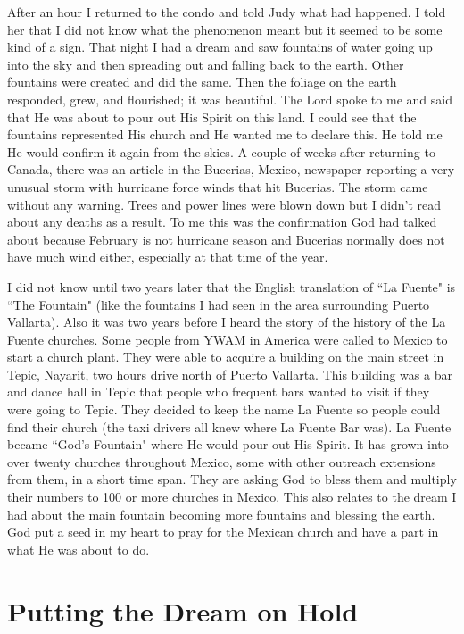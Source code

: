 \documentclass[oneside,12pt]{book}
\begin{document}
After an hour I returned to the condo and told Judy what had happened. I told her that I did not know what the phenomenon meant but it seemed to be some kind of a sign. That night I had a dream and saw fountains of water going up into the sky and then spreading out and falling back to the earth. Other fountains were created and did the same. Then the foliage on the earth responded, grew, and flourished; it was beautiful. The Lord spoke to me and said that He was about to pour out His Spirit on this land. I could see that the fountains represented His church and He wanted me to declare this. He told me He would confirm it again from the skies. A couple of weeks after returning to Canada, there was an article in the Bucerias, Mexico, newspaper reporting a very unusual storm with hurricane force winds that hit Bucerias. The storm came without any warning. Trees and power lines were blown down but I didn't read about any deaths as a result. To me this was the confirmation God had talked about because February is not hurricane season and Bucerias normally does not have much wind either, especially at that time of the year.

I did not know until two years later that the English translation of ``La Fuente" is ``The Fountain" (like the fountains I had seen in the area surrounding Puerto Vallarta). Also it was two years before I heard the story of the history of the La Fuente churches. Some people from YWAM in America were called to Mexico to start a church plant. They were able to acquire a building on the main street in Tepic, Nayarit, two hours drive north of Puerto Vallarta. This building was a bar and dance hall in Tepic that people who frequent bars wanted to visit if they were going to Tepic. They decided to keep the name La Fuente so people could find their church (the taxi drivers all knew where La Fuente Bar was). La Fuente became ``God's Fountain" where He would pour out His Spirit. It has grown into over twenty churches throughout Mexico, some with other outreach extensions from them, in a short time span. They are asking God to bless them and multiply their numbers to 100 or more churches in Mexico. This also relates to the dream I had about the main fountain becoming more fountains and blessing the earth. God put a seed in my heart to pray for the Mexican church and have a part in what He was about to do.


\section{Putting the Dream on Hold}
\
\end{document}
